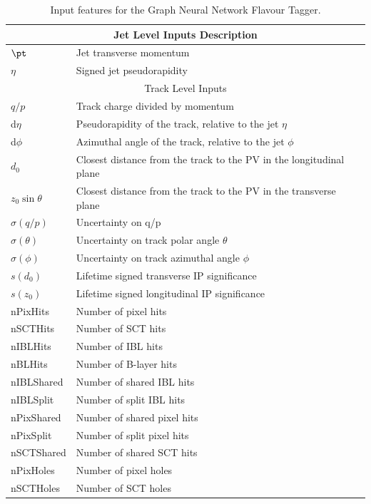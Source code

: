 \begin{table}[h]
    \centering
    \begin{tabular}{ll}
        \toprule
        \midrule
        \multicolumn{2}{c}{Jet Level Inputs Description} \\
        \midrule
        $\pt$ & Jet transverse momentum \\
        $\eta$ & Signed jet pseudorapidity \\
        \midrule
        \midrule
        \multicolumn{2}{c}{Track Level Inputs} \\
        \midrule
        $q/p$ & Track charge divided by momentum \\
        d$\eta$ & Pseudorapidity of the track, relative to the jet $\eta$ \\
        d$\phi$ & Azimuthal angle of the track, relative to the jet $\phi$ \\
        $d_0$ & Closest distance from the track to the PV in the longitudinal plane \\
        $z_0 \sin \theta$ & Closest distance from the track to the PV in the transverse plane \\
        $\sigma(q/p)$ & Uncertainty on q/p \\
        $\sigma(\theta)$ & Uncertainty on track polar angle $\theta$ \\
        $\sigma(\phi)$ & Uncertainty on track azimuthal angle $\phi$ \\
        $s(d_0)$ & Lifetime signed transverse IP significance \\
        $s(z_0)$ & Lifetime signed longitudinal IP significance \\
        nPixHits & Number of pixel hits \\
        nSCTHits & Number of SCT hits \\
        nIBLHits & Number of IBL hits \\
        nBLHits & Number of B-layer hits \\
        nIBLShared & Number of shared IBL hits \\
        nIBLSplit & Number of split IBL hits \\
        nPixShared & Number of shared pixel hits \\
        nPixSplit & Number of split pixel hits \\
        nSCTShared & Number of shared SCT hits \\
        nPixHoles & Number of pixel holes \\
        nSCTHoles & Number of SCT holes \\
        \bottomrule
    \end{tabular}
    \caption{Input features for the Graph Neural Network Flavour Tagger.}
    \label{tab:track_features}
\end{table}

